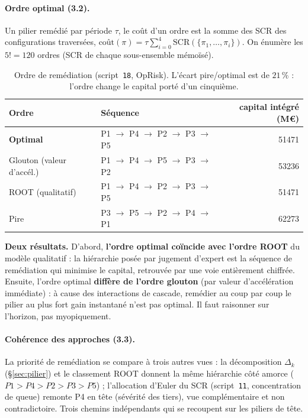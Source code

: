 \documentclass[11pt,a4paper]{article}
\begin{document}
\paragraph{Ordre optimal (3.2).} Un pilier remédié par période $\tau$, le coût d'un ordre est
la somme des SCR des configurations traversées,
$\text{coût}(\pi)=\tau\sum_{i=0}^{4}\mathrm{SCR}(\{\pi_1,\dots,\pi_i\})$. On énumère les
$5!=120$ ordres (SCR de chaque sous-ensemble mémoïsé).

\begin{table}[h]\centering\small
\renewcommand{\arraystretch}{1.25}
\begin{tabular}{@{}l l r@{}}
\toprule
Ordre & Séquence & capital intégré (M\euro) \\
\midrule
\textbf{Optimal} & P1 $\to$ P4 $\to$ P2 $\to$ P3 $\to$ P5 & 51471 \\
Glouton (valeur d'accél.) & P1 $\to$ P4 $\to$ P5 $\to$ P3 $\to$ P2 & 53236 \\
ROOT (qualitatif) & P1 $\to$ P4 $\to$ P2 $\to$ P3 $\to$ P5 & 51471 \\
Pire & P3 $\to$ P5 $\to$ P2 $\to$ P4 $\to$ P1 & 62273 \\
\bottomrule
\end{tabular}
\caption{Ordre de remédiation (script~\texttt{18}, OpRisk). L'écart pire/optimal est de
$21\,\%$ : l'ordre change le capital porté d'un cinquième.}
\end{table}

\begin{cle}
\textbf{Deux résultats.} D'abord, \textbf{l'ordre optimal coïncide avec l'ordre ROOT} du
modèle qualitatif : la hiérarchie posée par jugement d'expert est la séquence de remédiation
qui minimise le capital, retrouvée par une voie entièrement chiffrée. Ensuite, l'ordre optimal
\textbf{diffère de l'ordre glouton} (par valeur d'accélération immédiate) : à cause des
interactions de cascade, remédier au coup par coup le pilier au plus fort gain instantané
n'est pas optimal. Il faut raisonner sur l'horizon, pas myopiquement.
\end{cle}

\paragraph{Cohérence des approches (3.3).} La priorité de remédiation se compare à trois
autres vues : la décomposition $\Delta_k$ (\S\ref{sec:pilier}) et le classement ROOT donnent
la même hiérarchie côté amorce ($P1>P4>P2>P3>P5$) ; l'allocation d'Euler du SCR
(script~\texttt{11}, concentration de queue) remonte P4 en tête (sévérité des tiers), vue
complémentaire et non contradictoire. Trois chemins indépendants qui se recoupent sur les
piliers de tête.
\end{document}
